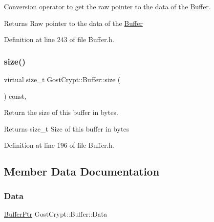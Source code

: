 Conversion operator to get the raw pointer to the data of the \hyperlink{class_gost_crypt_1_1_buffer}{Buffer}. 

\begin{DoxyReturn}{Returns}
Raw pointer to the data of the \hyperlink{class_gost_crypt_1_1_buffer}{Buffer} 
\end{DoxyReturn}


Definition at line 243 of file Buffer.\+h.

\mbox{\label{class_gost_crypt_1_1_buffer_a5324726029e7f906f2f14e54eeb1ab82}} 
\subsubsection{\texorpdfstring{size()}{size()}}
{\footnotesize\ttfamily virtual size\+\_\+t Gost\+Crypt\+::\+Buffer\+::size (\begin{DoxyParamCaption}{ }\end{DoxyParamCaption}) const\hspace{0.3cm}{\ttfamily [inline]}, {\ttfamily [virtual]}}



Return the size of this buffer in bytes. 

\begin{DoxyReturn}{Returns}
size\+\_\+t Size of this buffer in bytes 
\end{DoxyReturn}


Definition at line 196 of file Buffer.\+h.



\subsection{Member Data Documentation}
\mbox{\label{class_gost_crypt_1_1_buffer_a3754fa74b60e14928bb353c188a2cbbe}} 
\subsubsection{\texorpdfstring{Data}{Data}}
{\footnotesize\ttfamily \hyperlink{class_gost_crypt_1_1_buffer_ptr}{Buffer\+Ptr} Gost\+Crypt\+::\+Buffer\+::\+Data\hspace{0.3cm}{\ttfamily [protected]}}

